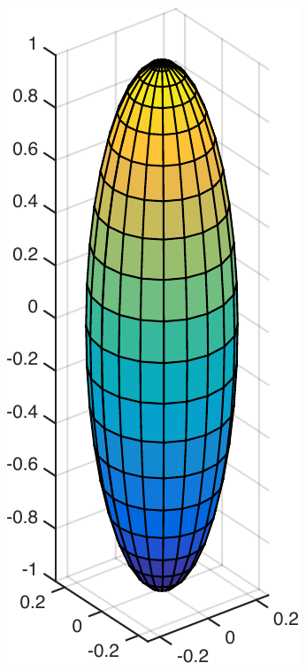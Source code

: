 \documentclass[a4paper,11pt]{kth-mag}
\begin{document}
\begin{figure}[!htbp]
  \centering
  \begin{subfigure}[h]{0.24\textwidth}
    \centering
    \includegraphics[width=\textwidth]{img/slender/1_4.pdf}

\end{subfigure}
\end{figure}
\end{document}
